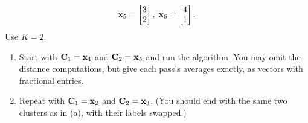 \begin{exercise}
\[  \mathbf{x}_5 = \begin{bmatrix} 3 \\ 2 \end{bmatrix},\;
  \mathbf{x}_6 = \begin{bmatrix} 4 \\ 1 \end{bmatrix}.
\]
Use $K = 2$.
\begin{enumerate}
  \item Start with $\mathbf{C}_1 = \mathbf{x}_4$ and $\mathbf{C}_2 = \mathbf{x}_5$ and run
        the algorithm. You may omit the distance computations, but give each
        pass's averages exactly, as vectors with fractional entries.
  \item Repeat with $\mathbf{C}_1 = \mathbf{x}_2$ and $\mathbf{C}_2 = \mathbf{x}_3$.
        (You should end with the same two clusters as in (a), with their
        labels swapped.)
\end{enumerate}
\end{exercise}

